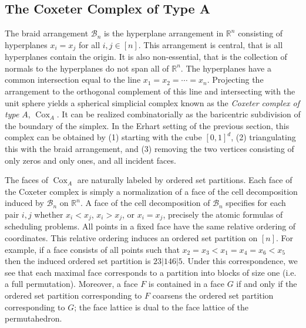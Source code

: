 \documentclass[12pt,reqno]{amsart}
\numberwithin{definition}{section}
\theoremstyle{definition}
\newcommand{\cox}{\operatorname{Cox}}
\begin{document}
\subsection{The Coxeter Complex of Type A}
The braid arrangement $\mathcal{B}_n$ is the hyperplane arrangement in
$\mathbb{R}^n$ consisting of hyperplanes $x_i = x_j$ for all $i,j \in [n]$.
This arrangement is central, that is all hyperplanes contain
the origin.  It is also non-essential, that is the collection of
normals to the hyperplanes do not span all of $\mathbb{R}^n$.  The
hyperplanes have a common intersection equal to the line $x_1 = x_2 = \cdots
= x_n$.  Projecting the arrangement to the orthogonal complement of
this line and intersecting with the unit sphere yields a spherical
simplicial complex known as the \emph{Coxeter complex of type $A$}, $\cox_A$.
It can be realized combinatorially as the baricentric subdivision of the
boundary of the simplex.  In the Erhart setting of the previous section, this complex
can be obtained by (1) starting with the cube $[0,1]^d$, (2) triangulating 
this with the braid arrangement, and (3) removing the two vertices consisting of 
only zeros and only ones, and all incident faces. 


The faces of $\cox_A$ are naturally  labeled by ordered
set partitions.  Each face of the Coxeter complex is simply a
normalization of a face of the cell decomposition induced by
$\mathcal{B}_n$ on $\mathbb{R}^n$.  A face of the cell decomposition of $\mathcal{B}_n$ specifies for each pair $i,j$ whether $x_i < x_j$, $x_i > x_j$, or $x_i = x_j$, precisely the atomic formulas of scheduling problems.  All points in a fixed face have
the same relative ordering of coordinates.  This relative ordering
induces an ordered set partition on $[n]$.  For example, if a face
consists of all points such that $x_2 = x_3 < x_1 =
x_4 = x_6 < x_5$ then the induced ordered set partition is
$23|146|5$.  Under this correspondence, we see that each maximal face
corresponds to a partition into blocks of size one (i.e. a full
permutation).  Moreover, a face $F$ is contained in a face $G$ if and only if
the ordered set partition corresponding to $F$ coarsens the ordered set partition
corresponding to $G$; the face lattice is dual to the face lattice of the permutahedron.
\end{document}
